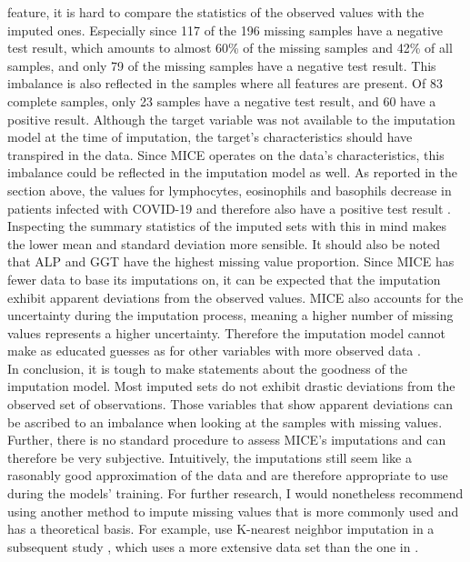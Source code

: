 feature, it is hard to compare the statistics of the observed values with the 
imputed ones. Especially since 117 of the 196 missing samples have a negative 
test result, which amounts to almost 60\% of the missing samples and 42\% of 
all samples, and only 79 of the missing samples have a negative test result. 
This imbalance is also reflected in the samples where all features are present. 
Of 83 complete samples, only 23 samples have a negative test result, and 60 
have 
a positive result. Although the target variable was not available to the 
imputation model at the time of imputation, the target's characteristics 
should have transpired in the data.
Since MICE operates on the data's characteristics, this imbalance could be 
reflected in the imputation model as well. As 
reported in the section above, the values for lymphocytes, eosinophils and 
basophils decrease in patients infected with COVID-19 and therefore also 
have a positive test result \cite{RN162, RN181}. Inspecting the summary 
statistics of the 
imputed sets with this in mind makes the lower mean and standard deviation 
more sensible.
It should also be noted that ALP and GGT have the highest missing value 
proportion. Since MICE has fewer data to base its imputations on, it can be 
expected that the imputation exhibit apparent deviations from the observed 
values. MICE also accounts for the uncertainty during the imputation process, 
meaning a higher number of missing values represents a higher uncertainty. 
Therefore the imputation model cannot make as educated guesses as for 
other variables with more observed data \cite{RN141, RN142}.
\\
In conclusion, it is tough to make statements about the goodness of the 
imputation model. Most imputed sets do not exhibit drastic deviations from the 
observed set of observations. Those variables that show apparent 
deviations can be ascribed to an imbalance when looking at the samples with 
missing values. Further, there is no standard procedure to assess MICE's 
imputations and can therefore be very subjective. Intuitively, 
the imputations still seem like a rasonably good approximation of the data and 
are 
therefore appropriate to use during the models' training.
For further research, I would nonetheless recommend using another method to 
impute missing values that is more commonly used and has a theoretical basis. 
For example, \citeauthor{RN127} use K-nearest neighbor imputation in a 
subsequent study \cite{RN179}, which uses a more extensive data set than the 
one in \cite{RN127}.
